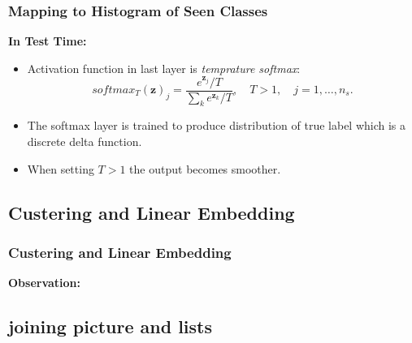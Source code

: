 \documentclass{beamer}
\begin{document}
\begin{frame}\frametitle{Mapping to Histogram of Seen Classes}
  \textbf{In Test Time:}
\begin{itemize}
  \item Activation function in last layer is \textit{temprature softmax}:
    \begin{equation}
    \label{softmax}
    softmax_T(\mathbf{z})_j = \frac{e^{\mathbf{z}_j}/T}{\sum_k e^{\mathbf{z}_k}/T}, \quad T>1,  \quad j = 1, \ldots, n_s.
    \end{equation}
\item The softmax layer is trained to produce distribution of true label which is a discrete delta function.
\item When setting $T > 1$ the output becomes smoother.
\end{itemize}
%
\begin{figure}
\hfill
{}
\hfill
{}
\hfill
\end{figure}
\end{frame}

\subsection{Custering and Linear Embedding}
\label{sub:Custering and Linear Embedding}
\begin{frame}\frametitle{Custering and Linear Embedding}
  \textbf{Observation:} 
\end{frame}





\subsection{joining picture and lists}
\end{document}
